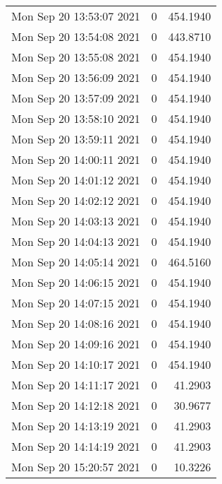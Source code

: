\begin{longtable}{lrr}
Mon Sep 20 13:53:07 2021 &                  0 &        454.1940 \\
Mon Sep 20 13:54:08 2021 &                  0 &        443.8710 \\
Mon Sep 20 13:55:08 2021 &                  0 &        454.1940 \\
Mon Sep 20 13:56:09 2021 &                  0 &        454.1940 \\
Mon Sep 20 13:57:09 2021 &                  0 &        454.1940 \\
Mon Sep 20 13:58:10 2021 &                  0 &        454.1940 \\
Mon Sep 20 13:59:11 2021 &                  0 &        454.1940 \\
Mon Sep 20 14:00:11 2021 &                  0 &        454.1940 \\
Mon Sep 20 14:01:12 2021 &                  0 &        454.1940 \\
Mon Sep 20 14:02:12 2021 &                  0 &        454.1940 \\
Mon Sep 20 14:03:13 2021 &                  0 &        454.1940 \\
Mon Sep 20 14:04:13 2021 &                  0 &        454.1940 \\
Mon Sep 20 14:05:14 2021 &                  0 &        464.5160 \\
Mon Sep 20 14:06:15 2021 &                  0 &        454.1940 \\
Mon Sep 20 14:07:15 2021 &                  0 &        454.1940 \\
Mon Sep 20 14:08:16 2021 &                  0 &        454.1940 \\
Mon Sep 20 14:09:16 2021 &                  0 &        454.1940 \\
Mon Sep 20 14:10:17 2021 &                  0 &        454.1940 \\
Mon Sep 20 14:11:17 2021 &                  0 &         41.2903 \\
Mon Sep 20 14:12:18 2021 &                  0 &         30.9677 \\
Mon Sep 20 14:13:19 2021 &                  0 &         41.2903 \\
Mon Sep 20 14:14:19 2021 &                  0 &         41.2903 \\
Mon Sep 20 15:20:57 2021 &                  0 &         10.3226 \\
\end{longtable}
